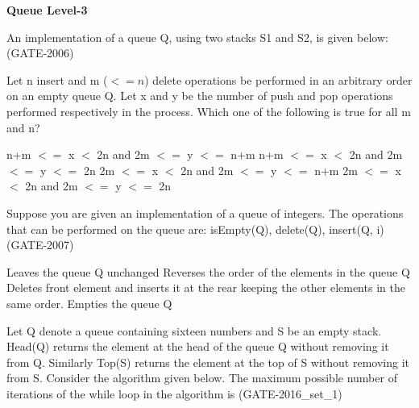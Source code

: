 
\centerline{\textbf{ \LARGE Queue Level-3}}

\begin{questyle}
  \question  An implementation of a queue Q, using two stacks S1 and S2, is given below:  (GATE-2006)
    
    Let n insert and m (\(<=n\)) delete operations be performed in an arbitrary order on an empty queue Q.
    Let x and y be the number of push and pop operations performed respectively in the process.
    Which one of the following is true for all m and n?

  \begin{choices}
    \CorrectChoice  n+m \(<=\) x \(<\) 2n and 2m \(<=\) y \(<=\) n+m
    \choice         n+m \(<=\) x \(<\) 2n and 2m \(<=\) y \(<=\) 2n
    \choice         2m \(<=\) x \(<\) 2n and 2m \(<=\) y \(<=\) n+m
    \choice         2m \(<=\) x \(<\) 2n and 2m \(<=\) y \(<=\) 2n
  \end{choices}
\end{questyle}


\begin{questyle}
  \question  Suppose you are given an implementation of a queue of integers. The operations that can be performed on the queue are:
            isEmpty(Q), delete(Q), insert(Q, i)  (GATE-2007)

            

  \begin{choices}
    \choice         Leaves the queue Q unchanged
    \CorrectChoice  Reverses the order of the elements in the queue Q
    \choice         Deletes front element  and inserts it at the rear keeping the other elements in the same order.
    \choice         Empties the queue Q
  \end{choices}
\end{questyle}

\begin{questyle}
  \question  Let Q denote a queue containing sixteen numbers and S be an empty stack. Head(Q) returns
            the element at the head of the queue Q without removing it from Q. Similarly Top(S) returns
            the element at the top of S without removing it from S. Consider the algorithm given below.
            The maximum possible number of iterations of the while loop in the algorithm is \fillin[256]   (GATE-2016\_set\_1)

          


\end{questyle}
